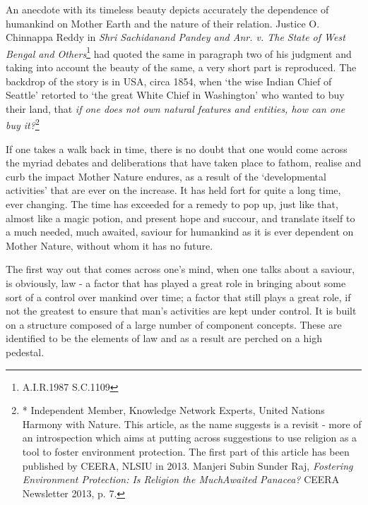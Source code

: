 \setcounter{figure}{0}
\setcounter{table}{0}
\setcounter{footnote}{0}


\begin{multicols}{2}


\noi
An anecdote with its timeless beauty depicts accurately the dependence of humankind on
Mother Earth and the nature of their relation. Justice O. Chinnappa Reddy in \textit{Shri Sachidanand
Pandey and Anr. v. The State of West Bengal and Others}\footnote{A.I.R.1987 S.C.1109} had quoted the same in paragraph two of his judgment and taking into account the beauty of the same, a very short part is reproduced. The backdrop of the story is in USA, circa 1854, when ‘the wise Indian Chief of Seattle’ retorted to ‘the great White Chief in Washington’ who wanted to buy their land, that \textit{if one does not own natural features and entities, how can one buy it?}\footnote{* Independent Member, Knowledge Network Experts, United Nations Harmony with Nature. This article, as the name suggests is a revisit - more of an introspection which aims at putting across suggestions to use religion as a tool to foster environment protection. The first part of this article has been published by CEERA, NLSIU in 2013. Manjeri Subin Sunder Raj, \textit{Fostering Environment Protection: Is Religion the MuchAwaited Panacea?} CEERA Newsletter 2013, p. 7.}

\noi
If one takes a walk back in time, there is no doubt that one would come across the myriad
debates and deliberations that have taken place to fathom, realise and curb the impact Mother
Nature endures, as a result of the ‘developmental activities’ that are ever on the increase. It has
held fort for quite a long time, ever changing. The time has exceeded for a remedy to pop up,
just like that, almost like a magic potion, and present hope and succour, and translate itself to
a much needed, much awaited, saviour for humankind as it is ever dependent on Mother Nature,
without whom it has no future.

\noi
The first way out that comes across one’s mind, when one talks about a saviour, is obviously, law - a factor that has played a great role in bringing about some sort of a control over mankind over time; a factor that still plays a great role, if not the greatest to ensure that man’s activities are kept under control. It is built on a structure composed of a large number of component concepts. These are identified to be the elements of law and as a result are perched on a high pedestal.


\end{multicols}
